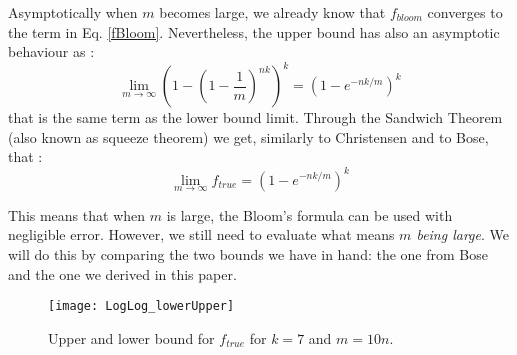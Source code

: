 
Asymptotically when $m$ becomes large, we already know that $f_{bloom}$ converges to the term in Eq. \ref{fBloom}. Nevertheless, the upper bound has also an asymptotic behaviour as :
\begin{equation}
\label{flim}
\lim\limits_{m \to \infty} \left(1-\left(1-\frac{1}{m}\right)^{nk}\right)^k = \left(1-e^{-nk/m}\right)^k 
\end{equation}
that is the same term as the lower bound limit. Through the Sandwich Theorem (also known as squeeze theorem) we get, similarly to Christensen and to Bose, that :
\begin{equation}
\label{flimtrue}
\lim\limits_{m \to \infty}  f_{true} =  \left(1-e^{-nk/m}\right)^k 
\end{equation}

This means that when $m$ is large, the Bloom's formula can be used with negligible error. However, we still need to evaluate what means \textit{$m$ being large}. We will do this by comparing the two bounds we have in hand: the one from Bose and the one we derived in this paper. 

\begin{figure}
\centering
\texttt{[image: LogLog\_lowerUpper]}
\caption{Upper and lower bound for $f_{true}$ for $k=7$ and $m=10n$.}
\label{fig:uplowbound}
\end{figure}

